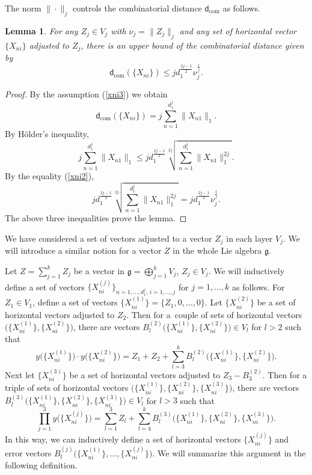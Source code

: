 \documentclass[pdftex]{sigma}
\numberwithin{equation}{section}
\newtheorem{Lemma}[Theorem]{Lemma}
\newcommand{\g}{\mathfrak{g}}
\begin{document}
The norm $\|\cdot\|_j$ controls the combinatorial distance $\mathsf{d}_{\mathrm{com}}$ as follows.

\begin{Lemma}\label{lemCC}
For any $Z_j\in V_j$ with $\nu_j=\|Z_j\|_j$ and any set of horizontal vector $\{X_{ni}\}$ adjusted to $Z_j$,
there is an upper bound of the combinatorial distance given by
\[
\mathsf{d}_{\mathrm{com}}(\{X_{ni}\})\leq jd_1^{\frac{2j-1}{2}}\nu_j^{\frac{1}{j}}.
\]
\end{Lemma}

\begin{proof}
By the assumption (\ref{xni3})
we obtain
\[
 \mathsf{d}_{\mathrm{com}}(\{X_{ni}\})=j \sum_{n=1}^{d_1^j}\|X_{n1}\|_1.
\]
By H\"older's inequality,
\[j \sum_{n=1}^{d_1^j}\|X_{n1}\|_1\leq jd_1^{\frac{2j-1}{2}}\sqrt[2j]{\sum_{n=1}^{d_1^j}\|X_{n1}\|_1^{2j}}.
\]
By the equality (\ref{xni2}),
\[
 jd_1^{\frac{2j-1}{2}}\sqrt[2j]{\sum_{n=1}^{d_1^j}\|X_{n1}\|_1^{2j}}=jd_1^{\frac{2j-1}{2}}\nu_j^{\frac{1}{j}}.
\]
The above three inequalities prove the lemma.
\end{proof}

We have considered a set of vectors adjusted to a vector $Z_j$ in each layer $V_j$.
We will introduce a similar notion for a vector $Z$ in the whole Lie algebra $\g$.

Let $Z=\sum_{j=1}^k Z_j$ be a vector in $\g=\bigoplus_{j=1}^k V_j$, $Z_j\in V_j$.
We will inductively define a set of vectors $\bigl\{X_{ni}^{(j)}\bigr\}_{n=1,\dots,d_1^j,\,i=1,\dots,j}$ for $j=1,\dots,k$ as follows.
For $Z_1\in V_1$,
define a set of vectors $\bigl\{X_{ni}^{(1)}\bigr\}=\{Z_1,0,\dots,0\}$.
Let $\bigl\{X_{ni}^{(2)}\bigr\}$ be a set of horizontal vectors adjusted to $Z_2$.
Then for a~couple of sets of horizontal vectors $\bigl(\bigl\{X_{ni}^{(1)}\bigr\},\bigl\{X_{ni}^{(2)}\bigr\}\bigr)$,
there are vectors $B_l^{(2)}\bigl(\bigl\{X_{ni}^{(1)}\bigr\},\bigl\{X_{ni}^{{(2)}}\bigr\}\bigr)\allowbreak\in V_l$ for $l>2$ such that
\[
y\bigl(\bigl\{X_{ni}^{(1)}\bigr\}\bigr)\cdot y\bigl(\bigl\{X_{ni}^{(2)}\bigr\}\bigr) =Z_1+Z_2+\sum_{l=3}^kB_l^{(2)}\bigl(\bigl\{X_{ni}^{(1)}\bigr\},\bigl\{X_{ni}^{(2)}\bigr\}\bigr).
\]
Next let $\bigl\{X_{ni}^{(3)}\bigr\}$ be a set of horizontal vectors adjusted to $Z_3-B_3^{(2)}$.
Then for a triple of sets of horizontal vectors $\bigl(\bigl\{X_{ni}^{(1)}\bigr\},\bigl\{X_{ni}^{(2)}\bigr\},\bigl\{X_{ni}^{(3)}\bigr\}\bigr)$,
there are vectors $B_l^{(3)}\bigl(\bigl\{X_{ni}^{(1)}\bigr\},\bigl\{X_{ni}^{(2)}\bigr\},\bigl\{X_{ni}^{(3)}\bigr\}\bigr)\allowbreak\in V_l$ for $l>3$ such that
\[
\prod_{j=1}^3y\big(\bigl\{X_{ni}^{(j)}\bigr\}\big)=\sum_{l=1}^3Z_l+\sum_{l=4}^k B_l^{(3)}\bigl(\bigl\{X_{ni}^{(1)}\bigr\},\bigl\{X_{ni}^{(2)}\bigr\},\bigl\{X_{ni}^{(3)}\bigr\}\bigr).
\]
In this way,
we can inductively define a set of horizontal vectors $\bigl\{X_{ni}^{(j)}\bigr\}$ and error vectors $B_l^{(j)}\bigl(\bigl\{X_{ni}^{(1)}\bigr\},\dots,\bigl\{X_{ni}^{(j)}\bigr\}\bigr)$.
We will summarize this argument in the following definition.
\end{document}
